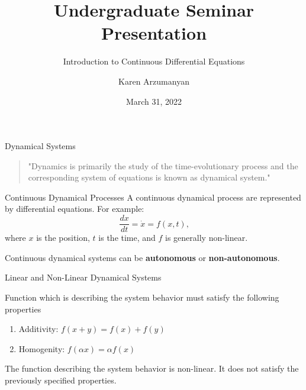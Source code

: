 \documentclass[18pt]{beamer}
\title{Undergraduate Seminar Presentation}
\subtitle{Introduction to Continuous Differential Equations}
\author{Karen Arzumanyan}
\date{March 31, 2022}
\begin{document}

\begin{frame}
    \maketitle
\end{frame}

\begin{frame}{Dynamical Systems}
    \begin{quote}
        "Dynamics is primarily the study of the time-evolutionary process and the corresponding system of equations is known as dynamical system."
    \end{quote}

\end{frame}

\begin{frame}{Continuous Dynamical Processes}
    A continuous dynamical process are represented by differential equations. For example:
    \[\frac{dx}{dt} = \dot{x} = f(x,t)\text{,}\]
    where $x$ is the position, $t$ is the time, and $f$ is generally non-linear.

    \pause{}
    Continuous dynamical systems can be \textbf{autonomous} or \textbf{non-autonomous}.
\end{frame}

\begin{frame} {Linear and Non-Linear Dynamical Systems}
    \begin{definition}
        Function which is describing the system behavior must satisfy the following properties
        \begin{enumerate}
            \item Additivity: $f(x+y) = f(x)+ f(y)$
            \item Homogenity: $f(\alpha x) = \alpha f(x)$
        \end{enumerate}
    \end{definition}
    \begin{definition}
        The function describing the system behavior is non-linear. It does not satisfy the previously specified properties.
    \end{definition}
\end{frame}
\end{document}
